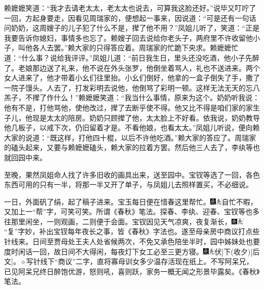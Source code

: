 赖嬷嬷笑道：“我才去请老太太，老太太也说去，可算我这脸还好。”说毕又叮咛了一回，方起身要走，因看见周瑞家的，便想起一事来，因说道：“可是还有一句话问奶奶，这周嫂子的儿子犯了什么不是，撵了他不用？”凤姐儿听了，笑道：“正是我要告诉你媳妇，事情多也忘了。赖嫂子回去说给你老头子，两府里不许收留他小子，叫他各人去罢。”赖大家的只得答应着。周瑞家的忙跪下央求。赖嬷嬷忙道：“什么事？说给我评评。”凤姐儿道：“前日我生日，里头还没吃酒，他小子先醉了。老娘那边送了礼来，他不说在外头张罗，他倒坐着骂人，礼也不送进来。两个女人进来了，他才带着小幺们往里抬。小幺们倒好，他拿的一盒子倒失了手，撒了一院子馒头。人去了，打发彩明去说他，他倒骂了彩明一顿。这样无法无天的忘八羔子，不撵了作什么！”赖嬷嬷笑道：“我当什么事情，原来为这个。奶奶听我说：他有不是，打他骂他，使他改过，撵了去断乎使不得。他又比不得是咱们家的家生子儿，他现是太太的陪房。奶奶只顾撵了他，太太脸上不好看。依我说，奶奶教导他几板子，以戒下次，仍旧留着才是。不看他娘，也看太太。”凤姐儿听说，便向赖大家的说道：“既这样，打他四十棍，以后不许他吃酒。”赖大家的答应了。周瑞家的磕头起来，又要与赖嬷嬷磕头，赖大家的拉着方罢。然后他三人去了，李纨等也就回园中来。

至晚，果然凤姐命人找了许多旧收的画具出来，送至园中。宝钗等选了一回，各色东西可用的只有一半，将那一半又开了单子，与凤姐儿去照样置买，不必细说。

一日，外面矾了绢，起了稿子进来。宝玉每日便在惜春这里帮忙。{\includegraphics[width=3mm]{../Images/00004}\includegraphics[width=3mm]{../Images/00012}\footnotesize \kaishu 自忙不暇，又加上一“帮”字，可笑可笑。所谓《春秋》笔法。}探春、李纨、迎春、宝钗等也多往那里闲坐，一则观画，二则便于会面。宝钗因见天气凉爽，夜复渐长，{\includegraphics[width=3mm]{../Images/00004}\includegraphics[width=3mm]{../Images/00012}\footnotesize \kaishu “复”字妙，补出宝钗每年夜长之事，皆《春秋》字法也。}遂至母亲房中商议打点些针线来。日间至贾母处王夫人处省候两次，不免又承色陪坐半时，园中姊妹处也要度时闲话一回，故日间不大得闲，每夜灯下女工必至三更方寝。{\includegraphics[width=3mm]{../Images/00004}\includegraphics[width=3mm]{../Images/00012}\footnotesize \kaishu {(代)}{[}伏{]}下{(收夕)}{[}后文{]}。{$\diamond$}写针线下“商议”二字，直将寡母训女多少温存活现在纸上。不写阿呆兄，已见阿呆兄终日醉饱优游，怒则吼，喜则跃，家务一概无闻之形景毕露矣。《春秋》笔法。}

